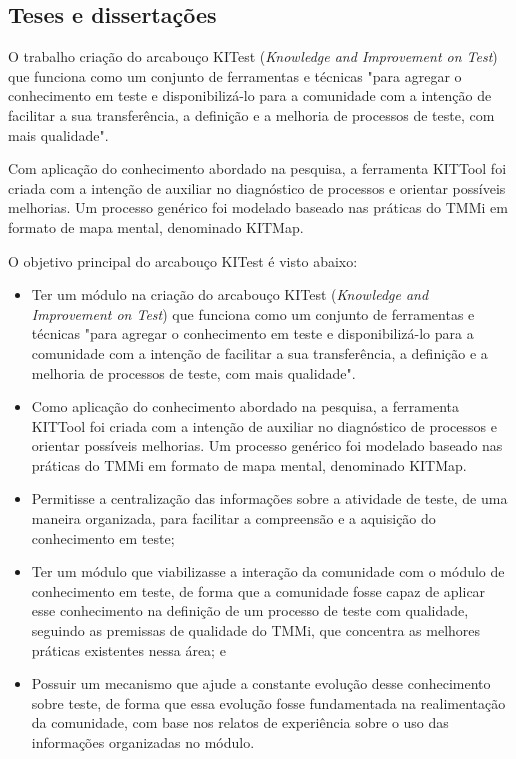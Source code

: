 \subsection{Teses e dissertações}
\label{sec:tesesdissertacoes}

O trabalho criação do arcabouço KITest (\textit{Knowledge and Improvement on Test}) \cite{Nina2011} que funciona como um conjunto de ferramentas e técnicas "para agregar o conhecimento em teste e disponibilizá-lo para a comunidade com a intenção de facilitar a sua transferência, a definição e a melhoria de processos de teste, com mais qualidade". 

Com aplicação do conhecimento abordado na pesquisa, a ferramenta KITTool foi criada com a intenção de auxiliar no diagnóstico de processos e orientar possíveis melhorias. Um processo genérico foi modelado baseado nas práticas do TMMi em formato de mapa mental, denominado KITMap.

O objetivo principal do arcabouço KITest é visto abaixo:

\begin{itemize}
\item Ter um módulo na criação do arcabouço KITest (\textit{Knowledge and Improvement on Test}) que funciona como um conjunto de ferramentas e técnicas "para agregar o conhecimento em teste e disponibilizá-lo para a comunidade com a intenção de facilitar a sua transferência, a definição e a melhoria de processos de teste, com mais qualidade".
\item Como aplicação do conhecimento abordado na pesquisa, a ferramenta KITTool foi criada com a intenção de auxiliar no diagnóstico de processos e orientar possíveis melhorias. Um processo genérico foi modelado baseado nas práticas do TMMi em formato de mapa mental, denominado KITMap.
\item Permitisse a centralização das informações sobre a atividade de teste, de uma maneira organizada, para facilitar a compreensão e a aquisição do conhecimento em teste;
\item Ter um módulo que viabilizasse a interação da comunidade com o módulo de conhecimento em teste, de forma que a comunidade fosse capaz de aplicar esse conhecimento na definição de um processo de teste com qualidade, seguindo as premissas de qualidade do TMMi, que concentra as melhores práticas existentes nessa área; e
\item Possuir um mecanismo que ajude a constante evolução desse conhecimento sobre teste, de forma que essa evolução fosse fundamentada na realimentação da comunidade, com base nos relatos de experiência sobre o uso das informações organizadas no módulo.
\end{itemize}

